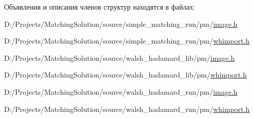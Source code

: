 Объявления и описания членов структур находятся в файлах:\begin{CompactItemize}
\item 
D:/Projects/MatchingSolution/source/simple\_\-matching\_\-run/pm/\hyperlink{simple__matching__run_2pm_2image_8h}{image.h}\item 
D:/Projects/MatchingSolution/source/simple\_\-matching\_\-run/pm/\hyperlink{simple__matching__run_2pm_2whimport_8h}{whimport.h}\item 
D:/Projects/MatchingSolution/source/walsh\_\-hadamard\_\-lib/pm/\hyperlink{walsh__hadamard__lib_2pm_2image_8h}{image.h}\item 
D:/Projects/MatchingSolution/source/walsh\_\-hadamard\_\-lib/pm/\hyperlink{walsh__hadamard__lib_2pm_2whimport_8h}{whimport.h}\item 
D:/Projects/MatchingSolution/source/walsh\_\-hadamard\_\-run/pm/\hyperlink{walsh__hadamard__run_2pm_2image_8h}{image.h}\item 
D:/Projects/MatchingSolution/source/walsh\_\-hadamard\_\-run/pm/\hyperlink{walsh__hadamard__run_2pm_2whimport_8h}{whimport.h}\end{CompactItemize}
